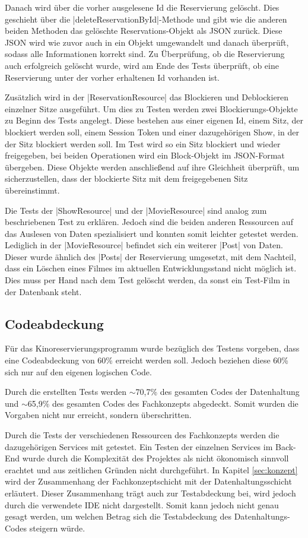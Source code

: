 Danach wird über die vorher ausgelesene Id die Reservierung gelöscht. Dies geschieht über die \jinline |deleteReservationById|-Methode und gibt wie die anderen beiden Methoden das gelöschte Reservations-Objekt als \acs{JSON} zurück.
Diese \acs{JSON} wird wie zuvor auch in ein Objekt umgewandelt und danach überprüft, sodass alle Informationen korrekt sind.
Zu Überprüfung, ob die Reservierung auch erfolgreich gelöscht wurde, wird am Ende des Tests überprüft, ob eine Reservierung unter der vorher erhaltenen Id vorhanden ist.

Zusätzlich wird in der \jinline |ReservationResource| das Blockieren und Deblockieren einzelner Sitze ausgeführt. Um dies zu Testen werden zwei Blockierungs-Objekte zu Beginn des Tests angelegt.
Diese bestehen aus einer eigenen Id, einem Sitz, der blockiert werden soll, einem Session Token und einer dazugehörigen Show, in der der Sitz blockiert werden soll.
Im Test wird so ein Sitz blockiert und wieder freigegeben, bei beiden Operationen wird ein Block-Objekt im \acs{JSON}-Format übergeben.
Diese Objekte werden anschließend auf ihre Gleichheit überprüft, um sicherzustellen, dass der blockierte Sitz mit dem freigegebenen Sitz übereinstimmt.

Die Tests der \jinline |ShowResource| und der \jinline |MovieResource| sind analog zum beschriebenen Test zu erklären.
Jedoch sind die beiden anderen Ressourcen auf das Auslesen von Daten spezialisiert und konnten somit leichter getestet werden.
Lediglich in der \jinline |MovieResource| befindet sich ein weiterer \jinline |Post| von Daten.
Dieser wurde ähnlich des \jinline |Posts| der Reservierung umgesetzt, mit dem Nachteil, dass ein Löschen eines Filmes im aktuellen Entwicklungsstand nicht möglich ist.
Dies muss per Hand nach dem Test gelöscht werden, da sonst ein Test-Film in der Datenbank steht.

\subsection{Codeabdeckung} 
\label{sec:codeabdeckung}
Für das Kinoreservierungsprogramm wurde bezüglich des Testens vorgeben, dass eine Codeabdeckung von 60\% erreicht werden soll.
Jedoch beziehen diese 60\% sich nur auf den eigenen logischen Code.

Durch die erstellten Tests werden $\sim$70,7\% des gesamten Codes der Datenhaltung und $\sim$65,9\% des gesamten Codes des Fachkonzepts abgedeckt.
Somit wurden die Vorgaben nicht nur erreicht, sondern überschritten.

Durch die Tests der verschiedenen Ressourcen des Fachkonzepts werden die dazugehörigen Services mit getestet.
Ein Testen der einzelnen Services im Back-End wurde durch die Komplexität des Projektes als nicht ökonomisch sinnvoll erachtet und aus zeitlichen Gründen nicht durchgeführt.
In Kapitel \vref{sec:konzept} wird der Zusammenhang der Fachkonzeptschicht mit der Datenhaltungsschicht erläutert.
Dieser Zusammenhang trägt auch zur Testabdeckung bei, wird jedoch durch die verwendete \acs{IDE} nicht dargestellt.
Somit kann jedoch nicht genau gesagt werden, um welchen Betrag sich die Testabdeckung des Datenhaltungs-Codes steigern würde.
